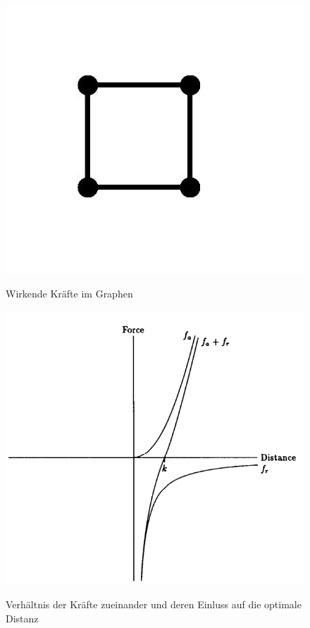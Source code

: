 \begin{figure}[t]
	{\includegraphics[scale=0.5]{bilder/standardgraph}\label{fig_standardgraph}
	}
	\\
	\caption[Wirkende Kräfte im Graphen]{Wirkende Kräfte im Graphen}
	\label{fig_testbild2}
\end{figure} 

\begin{figure}[t]
	\centering
	{\includegraphics[scale=0.7]{bilder/forcevsdistance}\label{fig_forcevsdistance}
	}\\
	\caption[Verhältnis der Kräfte zueinander und deren Einluss auf die optimale Distanz]{Verhältnis der Kräfte zueinander und deren Einluss auf die optimale Distanz}
	\label{fig_forcevsdistance}
\end{figure}

